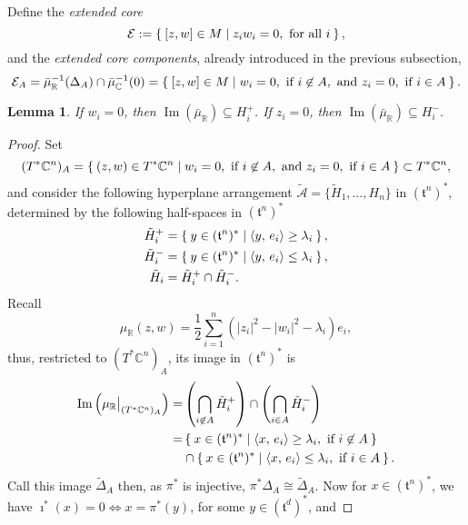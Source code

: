 \documentclass{amsart}
\newtheorem{lemma}[theorem]{Lemma}
\newcommand{\RR}{\mathbb{R}}
\newcommand{\CC}{\mathbb{C}}
\newcommand{\mcA}{\mathcal{A}}
\newcommand{\mcE}{\mathcal{E}}
\newcommand{\mft}{\mathfrak{t}}
\DeclareMathOperator{\Image}{Im}
\newcommand\restr[2]{{%
		\left.\kern-\nulldelimiterspace %
		#1 %
		\vphantom{\big|} %
		\right|_{#2} %
}}
\begin{document}
	Define the \emph{extended core}
	\[
		\mcE := \Set{[z,w] \in M | z_{i}w_{i} = 0, \text{ for all } i },
	\]
	and the \emph{extended core components}, already introduced in the previous subsection,
	\[
		\mcE_{A} = \bar{\mu}_{\RR}^{-1}(\Delta_{A})\cap \bar{\mu}_{\CC}^{-1}(0) = \Set{[z,w] \in M | w_{i} = 0, \text{ if } i \not\in A, \text{ and } z_{i} = 0, \text{ if } i \in A}.
	\]
	\begin{lemma}
		If $w_{i} = 0$, then $\Image(\bar{\mu}_{\RR}) \subseteq H_{i}^{+}$. If $z_{i} = 0$, then $\Image(\bar{\mu}_{\RR}) \subseteq H_{i}^{-}$.
	\end{lemma}
	
	\begin{proof}
		Set
		\[
			(T^{\ast}\CC^{n})_{A} = \Set{(z,w) \in T^{\ast}\CC^{n} | w_{i} = 0, \text{ if } i \not\in A, \text{ and } z_{i} = 0, \text{ if } i \in A} \subset T^{\ast}\CC^{n},
		\]
		and consider the following hyperplane arrangement $\tilde{\mcA} = \{ \tilde{H}_{1}, \ldots, H_{n}\}$ in $(\mft^{n})^{\ast}$, determined by the following half-spaces in $(\mft^{n})^{\ast}$
		\begin{align*}
			\tilde{H}_{i}^{+} &= \Set{ y \in (\mft^{n})^{\ast} | \langle y,\, e_{i} \rangle \geq \lambda_{i} }, \\
			\tilde{H}_{i}^{-} &= \Set{ y \in (\mft^{n})^{\ast} | \langle y,\, e_{i} \rangle \leq \lambda_{i} }, \\
			\tilde{H}_{i} &= \tilde{H}_{i}^{+} \cap \tilde{H}_{i}^{-}.
		\end{align*}
		Recall
		\[
			\mu_{\RR}(z,w) = \frac{1}{2}\sum_{i=1}^{n}\left(|z_{i}|^{2} - |w_{i}|^{2} - \lambda_{i} \right)e_{i},
		\]
		thus, restricted to $(T^{\ast}\CC^{n})_{A}$, its image in $(\mft^{n})^{\ast}$ is
		\begin{align*}
			\Image\left(\restr{\mu_{\RR}}{(T^{\ast}\CC^{n})_{A}} \right) =& \left(\bigcap_{i \not\in A} \tilde{H}_{i}^{+}\right) \cap \left(\bigcap_{i \in A} \tilde{H}_{i}^{-}\right) \\
			=& \Set{x \in (\mft^{n})^{\ast} | \langle x,\, e_{i} \rangle \geq \lambda_{i}, \text{ if } i \not\in A } \\
			&\cap \Set{x \in (\mft^{n})^{\ast} | \langle x,\, e_{i} \rangle \leq \lambda_{i}, \text{ if } i \in A } .
		\end{align*}
		Call this image $\tilde{\Delta}_{A}$ then, as $\pi^{\ast}$ is injective, $\pi^{\ast}\Delta_{A} \cong \tilde{\Delta}_{A}$. Now for $x \in (\mft^{n})^{\ast}$, we have $\imath^{\ast}(x) = 0 \iff x = \pi^{\ast}(y)$, for some $y \in (\mft^{d})^{\ast}$, and

\end{proof}
\end{document}
